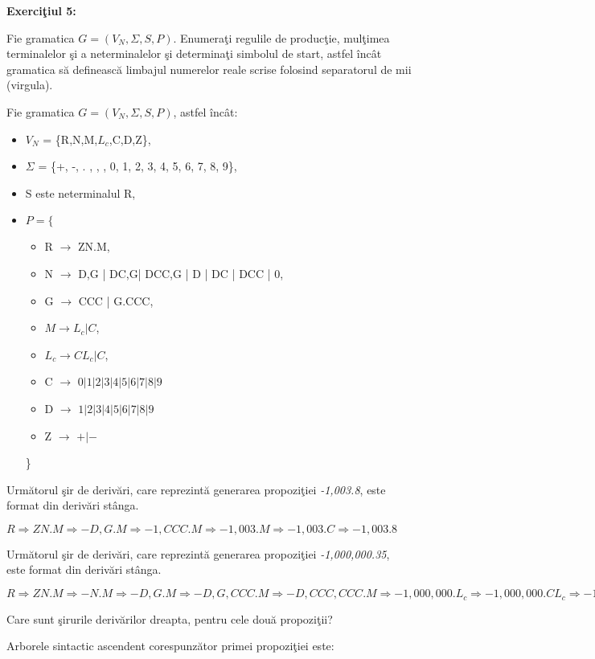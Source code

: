 \textbf{Exerciţiul 5:}

Fie gramatica $G = (V_{N}, \Sigma, S, P)$. Enumeraţi regulile de producţie, mulţimea terminalelor şi a neterminalelor şi determinaţi simbolul de start, astfel încât gramatica să definească limbajul numerelor reale scrise folosind separatorul de mii (virgula).

Fie gramatica $G = (V_{N}, \Sigma, S, P)$, astfel încât:

\begin{itemize}
\item
$V_{N}$ = \{R,N,M,$L_c$,C,D,Z\},
\item
$\Sigma$ = \{+, -, . , , , 0, 1, 2, 3, 4, 5, 6, 7, 8, 9\},
\item
S este neterminalul R,
\item
$P = \{$
\begin{itemize}
\item
R $\rightarrow$ ZN.M,
\item
N $\rightarrow$ D,G | DC,G| DCC,G | D | DC | DCC | 0,
\item
G $\rightarrow$ CCC | G.CCC,
\item
$M \rightarrow L_c |C$,
\item
$L_c \rightarrow CL_c | C$,
\item
C $\rightarrow$ $0|1|2|3|4|5|6|7|8|9$
\item
D $\rightarrow$ $1|2|3|4|5|6|7|8|9$
\item
Z $\rightarrow$  $+|-$
\end{itemize}
\}
\end{itemize}

Următorul şir de derivări, care reprezintă generarea propoziţiei \textit{-1,003.8}, este format din derivări stânga.

$ R \Rightarrow ZN.M  \Rightarrow -D,G.M  \Rightarrow -1,CCC.M \Rightarrow -1,003.M \Rightarrow -1,003.C \Rightarrow -1,003.8$ 

Următorul şir de derivări, care reprezintă generarea propoziţiei \textit{-1,000,000.35}, este format din derivări stânga.

$ R \Rightarrow ZN.M  \Rightarrow -N.M  \Rightarrow -D,G.M \Rightarrow -D,G,CCC.M \Rightarrow -D,CCC,CCC.M \Rightarrow -1,000,000.L_c \Rightarrow -1,000,000.CL_c \Rightarrow -1,000,000.3C \Rightarrow -1,000,000.35$ 

Care sunt şirurile derivărilor dreapta, pentru cele două propoziţii?

Arborele sintactic ascendent corespunzător primei propoziţiei este:

